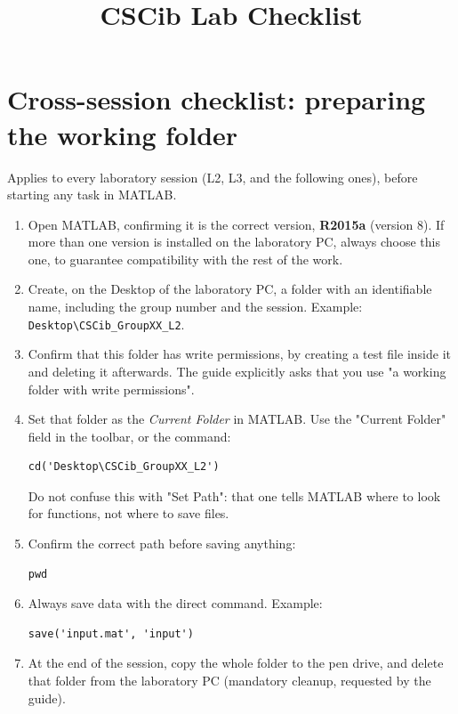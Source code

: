 \documentclass[a4paper,11pt]{article}
\title{CSCib Lab Checklist}
\author{}
\date{}
\begin{document}
\maketitle

\section*{Cross-session checklist: preparing the working folder}

Applies to every laboratory session (L2, L3, and the following ones), before
starting any task in MATLAB.

\begin{enumerate}[label=$\square$, leftmargin=1.5em]
  \item Open MATLAB, confirming it is the correct version, \textbf{R2015a} (version
  8). If more than one version is installed on the laboratory PC, always choose
  this one, to guarantee compatibility with the rest of the work.

  \item Create, on the Desktop of the laboratory PC, a folder with an identifiable
  name, including the group number and the session. Example:
  \texttt{Desktop\textbackslash CSCib\_GroupXX\_L2}.

  \item Confirm that this folder has write permissions, by creating a test file
  inside it and deleting it afterwards. The guide explicitly asks that you use "a
  working folder with write permissions".

  \item Set that folder as the \emph{Current Folder} in MATLAB. Use the "Current
  Folder" field in the toolbar, or the command:
  \begin{verbatim}
cd('Desktop\CSCib_GroupXX_L2')
  \end{verbatim}
  Do not confuse this with "Set Path": that one tells MATLAB where to look for
  functions, not where to save files.

  \item Confirm the correct path before saving anything:
  \begin{verbatim}
pwd
  \end{verbatim}

  \item Always save data with the direct command. Example:
  \begin{verbatim}
save('input.mat', 'input')
  \end{verbatim}

  \item At the end of the session, copy the whole folder to the pen drive, and
  delete that folder from the laboratory PC (mandatory cleanup, requested by the
  guide).
\end{enumerate}
\end{document}
